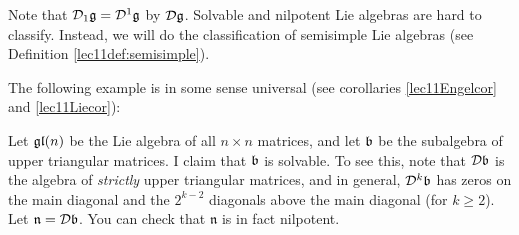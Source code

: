 Note that $\mathcal{D}_1\mathfrak{g}=\mathcal{D}^1\mathfrak{g}$ by $\mathcal{D}\mathfrak{g}$. Solvable and nilpotent Lie algebras are
 hard to classify. Instead, we will do the classification of semisimple Lie algebras
 (see Definition \ref{lec11def:semisimple}).

 The following example is in some sense universal (see corollaries \ref{lec11Engelcor}
 and \ref{lec11Liecor}):
 \begin{example}
   Let $\mathfrak{gl}(n)$ be the Lie algebra of all $n\times n$ matrices,
   and let $\mathfrak{b}$ be the subalgebra of
   upper triangular matrices. I claim that $\mathfrak{b}$ is solvable. To see this, note that
   $\mathcal{D}\mathfrak{b}$ is the algebra of \emph{strictly} upper triangular matrices, and in general,
   $\mathcal{D}^k\mathfrak{b}$ has zeros on the main diagonal and the $2^{k-2}$ diagonals above the main
   diagonal (for $k\ge 2$). Let $\mathfrak{n}=\mathcal{D}\mathfrak{b}$. You can check that $\mathfrak{n}$
   is in fact nilpotent.
 \end{example}

